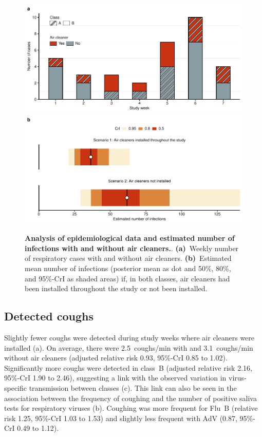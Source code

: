 \documentclass[fleqn,11pt]{wlscirep}
\begin{document}
\begin{figure}[!htpb]
    \includegraphics[width=\linewidth]{../../results/epi-data/cases_by_week.pdf} 
    \includegraphics[width=\linewidth]{../../results/epi-data/avoided-infections.pdf}
    \caption{\textbf{Analysis of epidemiological data and estimated number of infections with and without air cleaners.}. \textbf{(a)}~Weekly number of respiratory cases with and without air cleaners. \textbf{(b)}~Estimated mean number of infections (posterior mean as dot and 50\%, 80\%, and 95\%-CrI as shaded areas) if, in both classes, air cleaners had been installed throughout the study or not been installed.}
    \label{fig:redcap-results}
\end{figure}

\subsection{Detected coughs}

Slightly fewer coughs were detected during study weeks where air cleaners were installed (a). On average, there were 2.5~coughs/min with and 3.1~coughs/min without air cleaners (adjusted relative risk 0.93, 95\%-CrI 0.85 to 1.02). Significantly more coughs were detected in class~B (adjusted relative risk 2.16, 95\%-CrI 1.90 to 2.46), suggesting a link with the observed variation in virus-specific transmission between classes (c). This link can also be seen in the association between the frequency of coughing and the number of positive saliva tests for respiratory viruses (b). Coughing was more frequent for Flu~B (relative risk 1.25, 95\%-CrI 1.03 to 1.53) and slightly less frequent with AdV (0.87, 95\%-CrI 0.49 to 1.12). 
\end{document}
